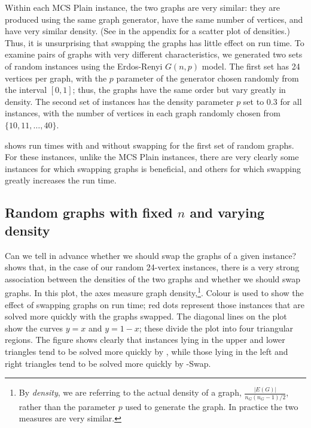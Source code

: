 Within each MCS Plain instance, the two graphs are very similar: they are produced
using the same graph generator, have the same number of vertices, and have very similar density.
(See  in the appendix for a scatter plot of densities.)
Thus, it is unsurprising that swapping the graphs has little effect on run time.
To examine pairs of graphs with very different characteristics, we generated two
sets of random instances using the Erdos-Renyi $G(n,p)$ model.  The first set has
24 vertices per graph, with the $p$ parameter of the generator chosen randomly from
the interval $[0,1]$; thus, the graphs have the same order but vary
greatly in density.  The second set of instances has the density parameter
$p$ set to $0.3$ for all instances, with the number of vertices in each graph randomly
chosen from $\{10, 11, \dots, 40\}$.

 shows run times with and without swapping
for the first set of random graphs.  For these instances, unlike the MCS Plain instances,
there are very clearly some instances for which swapping graphs is beneficial, and others
for which swapping greatly increases the run time.

\subsection{Random graphs with fixed $n$ and varying density}

Can we tell in advance whether we should swap the graphs of a given instance?
 shows that, in the case of our
random 24-vertex instances, there is a very strong association between the densities
of the two graphs and whether we should swap graphs.  In this plot, the axes
measure graph density,\footnote{By \emph{density}, we are referring to the actual density of a graph,
$\frac{|E(G)|}{n_G(n_G-1)/2}$, rather than the parameter $p$ used to generate
the graph. In practice the two measures are very similar.}. Colour is used to show
the effect of swapping graphs on run time; red dots represent those instances
that are solved more quickly with the graphs swapped.  The diagonal lines on the plot
show the curves $y=x$ and $y=1-x$; these divide the plot into four triangular regions.
The figure shows clearly that instances lying
in the upper and lower triangles tend to be solved more quickly by \McSplit, while
those lying in the left and right triangles tend to be solved more
quickly by \McSplit-Swap.

